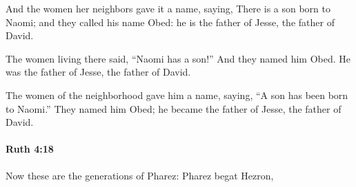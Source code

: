 			\begin{versebox}
					\item[BHS] 
					\item[LXX] 
					\item[ASV] And the women her neighbors gave it a name, saying, There is a son born to Naomi; and they called his name Obed: he is the father of Jesse, the father of David.
					\item[NIV] The women living there said, “Naomi has a son!” And they named him Obed. He was the father of Jesse, the father of David.
					\item[NRSV] The women of the neighborhood gave him a name, saying, “A son has been born to Naomi.” They named him Obed; he became the father of Jesse, the father of David.
			\end{versebox}

		\paragraph{Ruth 4:18} %
			\label{RUTH-4-18}

			Now these are the generations of Pharez: Pharez begat Hezron,


